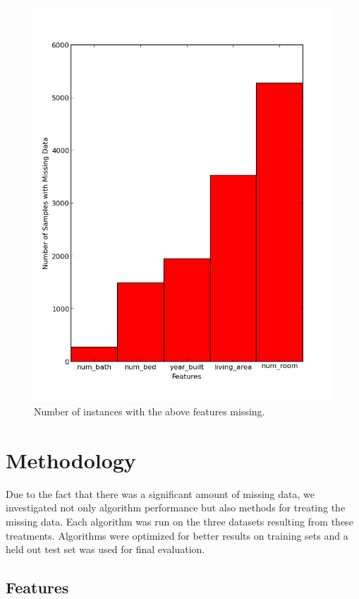 \documentclass{acm_proc_article-sp}
\begin{document}
	\begin{figure}[h!]
   		\centering
  		\includegraphics[width=\linewidth]{missing_data.png}
    		\caption{Number of instances with the above features missing. }
    		\label{fig:missingdata}
	\end{figure}
	
\section{Methodology}
	
	Due to the fact that there was a significant amount of missing data, we investigated not only algorithm performance but also methods for treating the missing data. Each algorithm was run on the three datasets resulting from these treatments. Algorithms were optimized for better results on training sets and a held out test set was used for final evaluation.
	
\subsection{Features}
	
\end{document}
